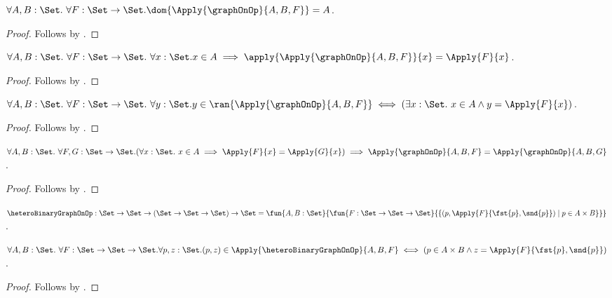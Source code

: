 \begin{proposition}\label{logical_graph_on_dom}
    $\forall A,B:\Set.\ \forall F:\Set\to\Set.
        \dom{\Apply{\graphOnOp}{A,B,F}}=A$.
\end{proposition}
\begin{proof}
    Follows by .
\end{proof}

\begin{proposition}\label{logical_graph_on_apply}
    $\forall A,B:\Set.\ \forall F:\Set\to\Set.\ \forall x:\Set.
        x\in A
        \implies
        \apply{\Apply{\graphOnOp}{A,B,F}}{x}
            =\Apply{F}{x}$.
\end{proposition}
\begin{proof}
    Follows by .
\end{proof}

\begin{proposition}\label{logical_graph_on_range}
    $\forall A,B:\Set.\ \forall F:\Set\to\Set.\ \forall y:\Set.
        y\in\ran{\Apply{\graphOnOp}{A,B,F}}
        \iff
        (\exists x:\Set.\ x\in A\land y=\Apply{F}{x})$.
\end{proposition}
\begin{proof}
    Follows by .
\end{proof}

\begin{proposition}\label{logical_graph_on_extensional}
    $\forall A,B:\Set.\ \forall F,G:\Set\to\Set.
        (\forall x:\Set.\ x\in A\implies
            \Apply{F}{x}=\Apply{G}{x})
        \implies
        \Apply{\graphOnOp}{A,B,F}
            =\Apply{\graphOnOp}{A,B,G}$.
\end{proposition}
\begin{proof}
    Follows by
        .
\end{proof}

\begin{definition}\label{logical_heterogeneous_binary_graph_on}
    $\heteroBinaryGraphOnOp:
        \Set\to\Set\to(\Set\to\Set\to\Set)\to\Set
        =\fun{A,B:\Set}{
                \fun{F:\Set\to\Set\to\Set}{
                    \{(p,\Apply{F}{\fst{p},\snd{p}})\mid
                        p\in A\times B\}}}$.
\end{definition}

\begin{proposition}\label{logical_heterogeneous_binary_graph_on_pair_membership}
    $\forall A,B:\Set.\ \forall F:\Set\to\Set\to\Set.
     \forall p,z:\Set.
        (p,z)\in
            \Apply{\heteroBinaryGraphOnOp}{A,B,F}
        \iff
        (p\in A\times B\land
            z=\Apply{F}{\fst{p},\snd{p}})$.
\end{proposition}
\begin{proof}
    Follows by .
\end{proof}

